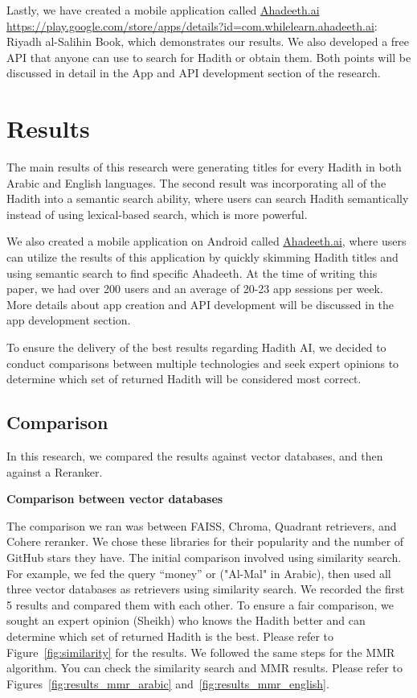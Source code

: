 Lastly, we have created a mobile application called \href{http://ahadeeth.ai/}{Ahadeeth.ai} \url{https://play.google.com/store/apps/details?id=com.whilelearn.ahadeeth.ai}: Riyadh al-Salihin Book, which demonstrates our results. We also developed a free API that anyone can use to search for Hadith or obtain them. Both points will be discussed in detail in the App and API development section of the research.


\section*{Results}

The main results of this research were generating titles for every Hadith in both Arabic and English languages. The second result was incorporating all of the Hadith into a semantic search ability, where users can search Hadith semantically instead of using lexical-based search, which is more powerful.

We also created a mobile application on Android called \href{http://ahadeeth.ai/}{Ahadeeth.ai}, where users can utilize the results of this application by quickly skimming Hadith titles and using semantic search to find specific Ahadeeth. At the time of writing this paper, we had over 200 users and an average of 20-23 app sessions per week. More details about app creation and API development will be discussed in the app development section.

To ensure the delivery of the best results regarding Hadith AI, we decided to conduct comparisons between multiple technologies and seek expert opinions to determine which set of returned Hadith will be considered most correct.

\subsection{Comparison}

In this research, we compared the results against vector databases, and then against a Reranker.

\textbf{Comparison between vector databases}

The comparison we ran was between FAISS, Chroma, Quadrant retrievers, and Cohere reranker. We chose these libraries for their popularity and the number of GitHub stars they have. The initial comparison involved using similarity search. For example, we fed the query “money” or 
("Al-Mal" in Arabic), then used all three vector databases as retrievers using similarity search. We recorded the first 5 results and compared them with each other. To ensure a fair comparison, we sought an expert opinion (Sheikh) who knows the Hadith better and can determine which set of returned Hadith is the best. Please refer to Figure~\ref{fig:similarity} for the results. We followed the same steps for the MMR algorithm. You can check the similarity search and MMR results. Please refer to Figures~\ref{fig:results_mmr_arabic} and~\ref{fig:results_mmr_english}.

